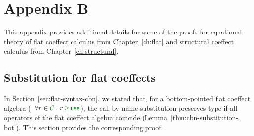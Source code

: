 
\chapter{Appendix B} 
\label{ch:appendix} 

This appendix provides additional details for some of the proofs for equational theory
of flat coeffect calculus from Chapter~\ref{ch:flat} and structural coeffect calculus
from Chapter~\ref{ch:structural}.



%
%                               

\section{Substitution for flat coeffects}
\label{sec:appendix-flat-cbn}
In Section~\ref{sec:flat-syntax-cbn}, we stated that, for a bottom-pointed flat coeffect
algebra (\ie~$\forall r \in \C \;.\; r \,\cgeq\, \cunit $), the call-by-name substitution 
preserves type if all operators of the flat coeffect algebra coincide (Lemma~\ref{thm:cbn-substitution-bot}).
This section provides the corresponding proof.

